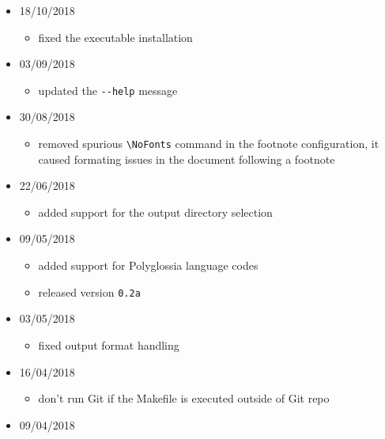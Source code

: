 \begin{itemize}
  \begin{itemize}
  \tightlist
  \item
    use the original section numbering in TOC in the Epub 3 output. The
    numbering of the \texttt{\textless{}ol\textgreater{}} list is
    disabled by CSS.
  \end{itemize}
\item
  18/10/2018

  \begin{itemize}
  \tightlist
  \item
    fixed the executable installation
  \end{itemize}
\item
  03/09/2018

  \begin{itemize}
  \tightlist
  \item
    updated the \texttt{-\/-help} message
  \end{itemize}
\item
  30/08/2018

  \begin{itemize}
  \tightlist
  \item
    removed spurious \texttt{\textbackslash{}NoFonts} command in the
    footnote configuration, it caused formating issues in the document
    following a footnote
  \end{itemize}
\item
  22/06/2018

  \begin{itemize}
  \tightlist
  \item
    added support for the output directory selection
  \end{itemize}
\item
  09/05/2018

  \begin{itemize}
  \tightlist
  \item
    added support for Polyglossia language codes
  \item
    released version \texttt{0.2a}
  \end{itemize}
\item
  03/05/2018

  \begin{itemize}
  \tightlist
  \item
    fixed output format handling
  \end{itemize}
\item
  16/04/2018

  \begin{itemize}
  \tightlist
  \item
    don't run Git if the Makefile is executed outside of Git repo
  \end{itemize}
\item
  09/04/2018


\end{itemize}
